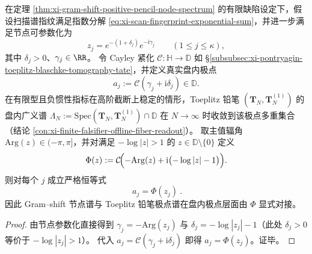 \begin{theorem}\label{thm:xi-gramshift-toeplitz-cayley-log-bridge}
在定理 \ref{thm:xi-gram-shift-positive-pencil-node-spectrum} 的有限缺陷设定下，假设扫描谱指纹满足指数分解 \eqref{eq:xi-scan-fingerprint-exponential-sum}，并进一步满足节点可参数化为
\[
z_j=e^{-(1+\delta_j)}e^{-\mathrm{i}\gamma_j}\qquad(1\le j\le\kappa),
\]
其中 \(\delta_j>0\)、\(\gamma_j\in\RR\)。
令 Cayley 紧化 \(\mathcal{C}:\mathbb{H}\to\mathbb{D}\) 如 \S\ref{subsubsec:xi-pontryagin-toeplitz-blaschke-tomography-tate}，并定义真实盘内极点
\[
a_j:=\mathcal{C}(\gamma_j+\mathrm{i}\delta_j)\in\mathbb{D}.
\]
在有限型且负惯性指标在高阶截断上稳定的情形，Toeplitz 铅笔 \((\mathbf{T}_N,\mathbf{T}_N^{(1)})\) 的盘内广义谱
\(
\Lambda_N:=\mathrm{Spec}(\mathbf{T}_N,\mathbf{T}_N^{(1)})\cap\mathbb{D}
\)
在 \(N\to\infty\) 时收敛到该极点多重集合（结论 \ref{con:xi-finite-falsifier-offline-fiber-readout}）。
取主值辐角 \(\mathrm{Arg}(z)\in(-\pi,\pi]\)，并对满足 \(-\log|z|>1\) 的 \(z\in\mathbb{D}\setminus\{0\}\) 定义
\[
\Phi(z):=\mathcal{C}\!\Bigl(-\mathrm{Arg}(z)+\mathrm{i}\bigl(-\log|z|-1\bigr)\Bigr).
\]
则对每个 \(j\) 成立严格恒等式
\[
\boxed{\ a_j=\Phi(z_j)\ }.
\]
因此 Gram--shift 节点谱与 Toeplitz 铅笔极点谱在盘内极点层面由 \(\Phi\) 显式对接。
\end{theorem}
\begin{proof}
由节点参数化直接得到
\(
\gamma_j=-\mathrm{Arg}(z_j)
\)
与
\(
\delta_j=-\log|z_j|-1
\)（此处 \(\delta_j>0\) 等价于 \(-\log|z_j|>1\)）。
代入 \(a_j=\mathcal{C}(\gamma_j+\mathrm{i}\delta_j)\) 即得 \(a_j=\Phi(z_j)\)。证毕。
\end{proof}

